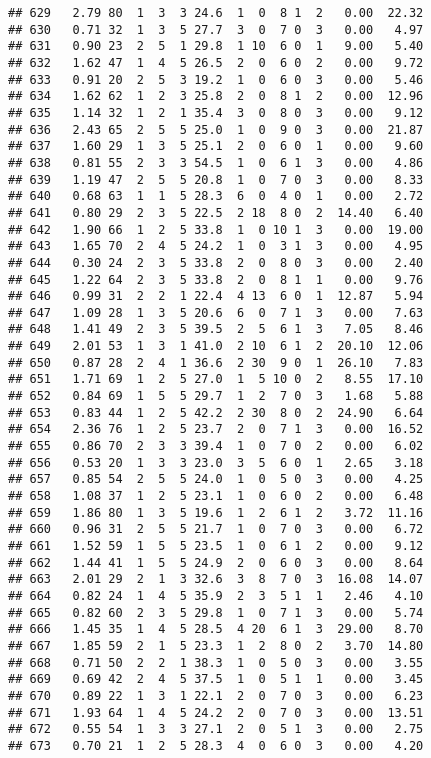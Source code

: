 \documentclass[
]{article}
\begin{document}
\begin{verbatim}
## 629   2.79 80  1  3  3 24.6  1  0  8 1  2   0.00  22.32
## 630   0.71 32  1  3  5 27.7  3  0  7 0  3   0.00   4.97
## 631   0.90 23  2  5  1 29.8  1 10  6 0  1   9.00   5.40
## 632   1.62 47  1  4  5 26.5  2  0  6 0  2   0.00   9.72
## 633   0.91 20  2  5  3 19.2  1  0  6 0  3   0.00   5.46
## 634   1.62 62  1  2  3 25.8  2  0  8 1  2   0.00  12.96
## 635   1.14 32  1  2  1 35.4  3  0  8 0  3   0.00   9.12
## 636   2.43 65  2  5  5 25.0  1  0  9 0  3   0.00  21.87
## 637   1.60 29  1  3  5 25.1  2  0  6 0  1   0.00   9.60
## 638   0.81 55  2  3  3 54.5  1  0  6 1  3   0.00   4.86
## 639   1.19 47  2  5  5 20.8  1  0  7 0  3   0.00   8.33
## 640   0.68 63  1  1  5 28.3  6  0  4 0  1   0.00   2.72
## 641   0.80 29  2  3  5 22.5  2 18  8 0  2  14.40   6.40
## 642   1.90 66  1  2  5 33.8  1  0 10 1  3   0.00  19.00
## 643   1.65 70  2  4  5 24.2  1  0  3 1  3   0.00   4.95
## 644   0.30 24  2  3  5 33.8  2  0  8 0  3   0.00   2.40
## 645   1.22 64  2  3  5 33.8  2  0  8 1  1   0.00   9.76
## 646   0.99 31  2  2  1 22.4  4 13  6 0  1  12.87   5.94
## 647   1.09 28  1  3  5 20.6  6  0  7 1  3   0.00   7.63
## 648   1.41 49  2  3  5 39.5  2  5  6 1  3   7.05   8.46
## 649   2.01 53  1  3  1 41.0  2 10  6 1  2  20.10  12.06
## 650   0.87 28  2  4  1 36.6  2 30  9 0  1  26.10   7.83
## 651   1.71 69  1  2  5 27.0  1  5 10 0  2   8.55  17.10
## 652   0.84 69  1  5  5 29.7  1  2  7 0  3   1.68   5.88
## 653   0.83 44  1  2  5 42.2  2 30  8 0  2  24.90   6.64
## 654   2.36 76  1  2  5 23.7  2  0  7 1  3   0.00  16.52
## 655   0.86 70  2  3  3 39.4  1  0  7 0  2   0.00   6.02
## 656   0.53 20  1  3  3 23.0  3  5  6 0  1   2.65   3.18
## 657   0.85 54  2  5  5 24.0  1  0  5 0  3   0.00   4.25
## 658   1.08 37  1  2  5 23.1  1  0  6 0  2   0.00   6.48
## 659   1.86 80  1  3  5 19.6  1  2  6 1  2   3.72  11.16
## 660   0.96 31  2  5  5 21.7  1  0  7 0  3   0.00   6.72
## 661   1.52 59  1  5  5 23.5  1  0  6 1  2   0.00   9.12
## 662   1.44 41  1  5  5 24.9  2  0  6 0  3   0.00   8.64
## 663   2.01 29  2  1  3 32.6  3  8  7 0  3  16.08  14.07
## 664   0.82 24  1  4  5 35.9  2  3  5 1  1   2.46   4.10
## 665   0.82 60  2  3  5 29.8  1  0  7 1  3   0.00   5.74
## 666   1.45 35  1  4  5 28.5  4 20  6 1  3  29.00   8.70
## 667   1.85 59  2  1  5 23.3  1  2  8 0  2   3.70  14.80
## 668   0.71 50  2  2  1 38.3  1  0  5 0  3   0.00   3.55
## 669   0.69 42  2  4  5 37.5  1  0  5 1  1   0.00   3.45
## 670   0.89 22  1  3  1 22.1  2  0  7 0  3   0.00   6.23
## 671   1.93 64  1  4  5 24.2  2  0  7 0  3   0.00  13.51
## 672   0.55 54  1  3  3 27.1  2  0  5 1  3   0.00   2.75
## 673   0.70 21  1  2  5 28.3  4  0  6 0  3   0.00   4.20

\end{verbatim}
\end{document}
